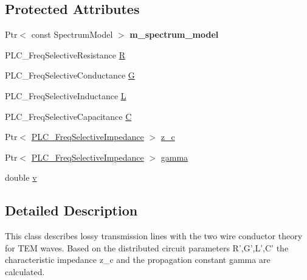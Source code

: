 \subsection*{\-Protected \-Attributes}
\begin{DoxyCompactItemize}
\item 
\hypertarget{classns3_1_1PLC__Cable_acf5374d7da9ed1df684cdfcd05247763}{\-Ptr$<$ const \-Spectrum\-Model $>$ {\bfseries m\-\_\-spectrum\-\_\-model}}\label{classns3_1_1PLC__Cable_acf5374d7da9ed1df684cdfcd05247763}

\item 
\-P\-L\-C\-\_\-\-Freq\-Selective\-Resistance \hyperlink{classns3_1_1PLC__Cable_a1770f66065636bde27fa4d8e35c8a534}{\-R}
\item 
\-P\-L\-C\-\_\-\-Freq\-Selective\-Conductance \hyperlink{classns3_1_1PLC__Cable_af2c7882c896e9bc7f98121f7a3f25b53}{\-G}
\item 
\-P\-L\-C\-\_\-\-Freq\-Selective\-Inductance \hyperlink{classns3_1_1PLC__Cable_a721d49ba4225f914d773d085c2d1f911}{\-L}
\item 
\-P\-L\-C\-\_\-\-Freq\-Selective\-Capacitance \hyperlink{classns3_1_1PLC__Cable_a2443b8723d75123547011498d535fe48}{\-C}
\item 
\-Ptr$<$ \hyperlink{classns3_1_1PLC__FreqSelectiveValue}{\-P\-L\-C\-\_\-\-Freq\-Selective\-Impedance} $>$ \hyperlink{classns3_1_1PLC__Cable_a510fc016469182d4a8d0864f291f5968}{z\-\_\-c}
\item 
\-Ptr$<$ \hyperlink{classns3_1_1PLC__FreqSelectiveValue}{\-P\-L\-C\-\_\-\-Freq\-Selective\-Impedance} $>$ \hyperlink{classns3_1_1PLC__Cable_aef9b830c80f3a26988eebe1970e942d8}{gamma}
\item 
double \hyperlink{classns3_1_1PLC__Cable_abbc2c9cb7b669f4c30c5a15669b9d3ea}{v}
\end{DoxyCompactItemize}


\subsection{\-Detailed \-Description}
\-This class describes lossy transmission lines with the two wire conductor theory for \-T\-E\-M waves. \-Based on the distributed circuit parameters \-R',\-G',\-L',\-C' the characteristic impedance z\-\_\-c and the propagation constant gamma are calculated. 

